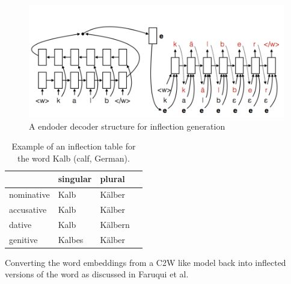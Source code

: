 \begin{figure}[H]
\begin{center}
  \includegraphics[width=\textwidth]{./img/inflection-generatior}
  \caption{A endoder decoder structure for inflection generation}
  \label{fig:inflection-generatior}
\end{center}
\end{figure}

\begin{table}
\begin{center}
\begin{tabular}{ l l l l }
  \hline
             & singular & plural \\ \hline
  nominative & Kalb & K\"alber \\
  accusative & Kalb & K\"alber \\
  dative & Kalb & K\"albern \\
  genitive & Kalbes & K\"alber \\
\end{tabular}
\end{center}
\caption{Example of an inflection table for the word Kalb (calf, German).}
\label{tab:inflections}
\end{table}

Converting the word embeddings from a C2W like model back into inflected versions of the word 
as discussed in Faruqui et al. \cite{DBLP:journals/corr/FaruquiTND15}

